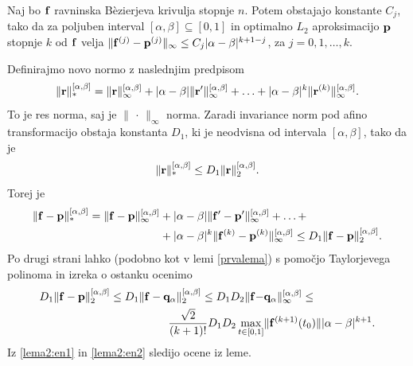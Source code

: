 \begin{lema}\label{drugalema}
Naj bo ${\bf f}$ ravninska B\`{e}zierjeva krivulja stopnje $n$. Potem obstajajo konstante $C_{j}$, tako da za poljuben interval $[\alpha,\beta]\subseteq[0,1]$ in optimalno $L_2$ aproksimacijo ${\bf p}$ stopnje $k$ od ${\bf f}$ velja
$\lVert {\bf f}^{(j)} - {\bf p}^{(j)} \rVert _{\infty} \leq C_{j}|\alpha - \beta|^{k+1-j}$, za $j=0,1,\ldots,k$. 
\end{lema}
\proof
Definirajmo novo normo z naslednjim predpisom
$$
\lVert {\bf r}\rVert _{*}^{[\alpha,\beta]} = \lVert {\bf r}\rVert _\infty^{[\alpha,\beta]} + |\alpha - \beta|\lVert {\bf r}'\rVert _\infty^{[\alpha,\beta]} + \ldots + 
 |\alpha - \beta|^k\lVert {\bf r}^{(k)}\rVert _\infty^{[\alpha,\beta]}.
$$
To je res norma, saj je $\lVert \,\cdot\, \rVert _\infty$ norma. Zaradi invariance norm pod afino transformacijo obstaja konstanta $D_1$, ki je neodvisna od intervala $[\alpha,\beta]$, tako da je 
$$
\lVert {\bf r}\rVert _{*}^{[\alpha,\beta]} \leq D_1 \lVert {\bf r}\rVert _{2}^{[\alpha,\beta]}.
$$
Torej je 
\begin{equation}\label{lema2:en1}
\begin{split}
\lVert {\bf f} - {\bf p}\rVert _{*}^{[\alpha,\beta]}  =  \lVert {\bf f} - {\bf p}\rVert _\infty^{[\alpha,\beta]}  &+  |\alpha - \beta|\lVert {\bf f}' - {\bf p}'\rVert _\infty^{[\alpha,\beta]} + \ldots +\\ 
   & +  |\alpha - \beta|^k\lVert {\bf f}^{(k)} - {\bf p}^{(k)}\rVert _\infty^{[\alpha,\beta]} \leq 
 D_1 \lVert {\bf f} - {\bf p}\rVert _{2}^{[\alpha,\beta]}.
 \end{split}
\end{equation}
Po drugi strani lahko (podobno kot v lemi \ref{prvalema}) s pomočjo Taylorjevega polinoma in izreka o ostanku ocenimo
\begin{equation}\label{lema2:en2}
\begin{split}
D_1 \lVert {\bf f} - {\bf p}\rVert _{2}^{[\alpha,\beta]} \leq 
D_1 \lVert {\bf f} - {\bf q}_\alpha\rVert _{2}^{[\alpha,\beta]} \leq 
D_1D_2 \lVert {\bf f} - &{\bf q}_\alpha\rVert _{\infty}^{[\alpha,\beta]} \leq \\
\frac{\sqrt{2}}{(k+1)!}  D_1D_2\max _{t\in [0,1]}& \lVert {\bf f}^{(k+1)}(t_0) \rVert |\alpha - \beta|^{k+1}.
\end{split}
\end{equation}
\endproof
Iz \ref{lema2:en1} in \ref{lema2:en2} sledijo ocene iz leme.
